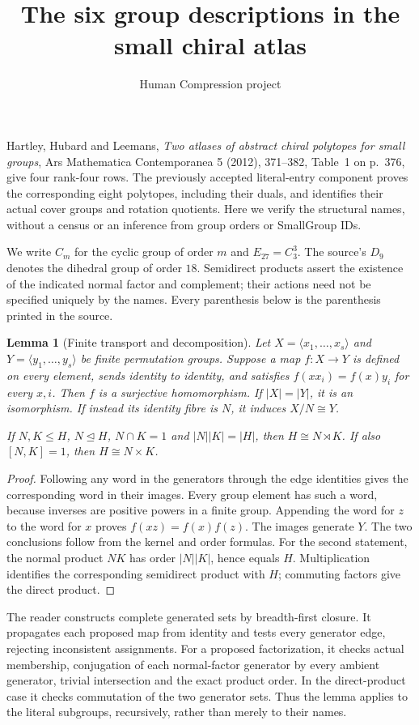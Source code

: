 \documentclass[11pt,a4paper]{article}
\title{The six group descriptions in the small chiral atlas}
\author{Human Compression project}\date{}
\newtheorem{lemma}{Lemma}\newtheorem{theorem}{Theorem}
\begin{document}
\maketitle
Hartley, Hubard and Leemans, \emph{Two atlases of abstract chiral
polytopes for small groups}, Ars Mathematica Contemporanea 5 (2012),
371--382, Table~1 on p.~376, give four rank-four rows. The previously
accepted literal-entry component proves the corresponding eight
polytopes, including their duals, and identifies their actual cover
groups and rotation quotients. Here we verify the structural names,
without a census or an inference from group orders or SmallGroup IDs.

We write $C_m$ for the cyclic group of order $m$ and $E_{27}=C_3^3$.
The source's $D_9$ denotes the dihedral group of order $18$.
Semidirect products assert the existence of the indicated normal factor
and complement; their actions need not be specified uniquely by the
names. Every parenthesis below is the parenthesis printed in the source.

\begin{lemma}[Finite transport and decomposition]
Let $X=\langle x_1,\ldots,x_s\rangle$ and
$Y=\langle y_1,\ldots,y_s\rangle$ be finite permutation groups.
Suppose a map $f:X\to Y$ is defined on every element, sends identity
to identity, and satisfies $f(xx_i)=f(x)y_i$ for every $x,i$.
Then $f$ is a surjective homomorphism. If $|X|=|Y|$, it is an
isomorphism. If instead its identity fibre is $N$, it induces
$X/N\cong Y$.

If $N,K\leq H$, $N\trianglelefteq H$, $N\cap K=1$ and
$|N||K|=|H|$, then $H\cong N\rtimes K$. If also $[N,K]=1$,
then $H\cong N\times K$.
\end{lemma}
\begin{proof}
Following any word in the generators through the edge identities gives
the corresponding word in their images. Every group element has such
a word, because inverses are positive powers in a finite group.
Appending the word for $z$ to the word for $x$ proves
$f(xz)=f(x)f(z)$. The images generate $Y$. The two conclusions follow
from the kernel and order formulas. For the second statement, the
normal product $NK$ has order $|N||K|$, hence equals $H$.
Multiplication identifies the corresponding semidirect product with
$H$; commuting factors give the direct product.
\end{proof}

The reader constructs complete generated sets by breadth-first closure.
It propagates each proposed map from identity and tests every generator
edge, rejecting inconsistent assignments. For a proposed factorization,
it checks actual membership, conjugation of each normal-factor generator
by every ambient generator, trivial intersection and the exact product
order. In the direct-product case it checks commutation of the two
generator sets. Thus the lemma applies to the literal subgroups,
recursively, rather than merely to their names.
\end{document}
